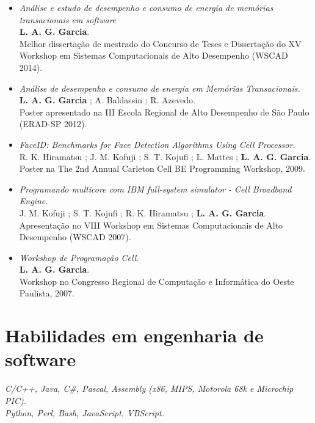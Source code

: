 \documentclass[10pt]{article} %
\begin{document}
\begin{itemize}
 \item \textit{Análise e estudo de desempenho e consumo de energia de memórias transacionais em software} \\
  \textbf{L. A. G. Garcia}. \\
  Melhor dissertação de mestrado do Concurso de Teses e Dissertação do XV Workshop em Sistemas Computacionais de Alto Desempenho (WSCAD 2014).
 \item \textit{Análise de desempenho e consumo de energia em Memórias Transacionais.} \\
  \textbf{L. A. G. Garcia} ; A. Baldassin ; R. Azevedo. \\
  Poster apresentado na III Escola Regional de Alto Desempenho de São Paulo (ERAD-SP 2012).
 \item \textit{FaceID: Benchmarks for Face Detection Algorithms Using Cell Processor.} \\
  R. K. Hiramatsu ; J. M. Kofuji ; S. T. Kojufi ; L. Mattes ; \textbf{L. A. G. Garcia}. \\
  Poster na The 2nd Annual Carleton Cell BE Programming Workshop, 2009.
 \item \textit{Programando multicore com IBM full-system simulator - Cell Broadband Engine.} \\
  J. M. Kofuji ; S. T. Kojufi ; R. K. Hiramatsu ; \textbf{L. A. G. Garcia}. \\
  Apresentação no VIII Workshop em Sistemas Computacionais de Alto Desempenho (WSCAD 2007).
 \item \textit{Workshop de Programação Cell}. \\
  \textbf{L. A. G. Garcia}. \\
  Workshop no Congresso Regional de Computação e Informática do Oeste Paulista, 2007.
\end{itemize}


\section{Habilidades em engenharia de software}

{
\textit{C/C++, Java, C\#, Pascal, Assembly (x86, MIPS, Motorola 68k e Microchip PIC).} \\
\textit{Python, Perl, Bash, JavaScript, VBScript.} \\
}
\end{document}
